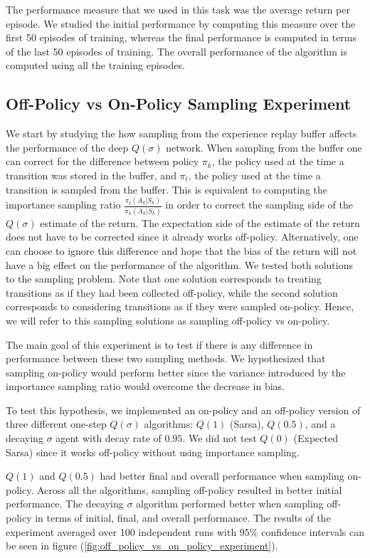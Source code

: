 The performance measure that we used in this task was the average return per episode.
We studied the initial performance by computing this measure over the first 50 episodes of training, whereas the final performance is computed in terms of the last 50 episodes of training.
The overall performance of the algorithm is computed using all the training episodes.

\subsection{Off-Policy vs On-Policy Sampling Experiment}

We start by studying the how sampling from the experience replay buffer affects the performance of the deep $Q(\sigma)$ network.
When sampling from the buffer one can correct for the difference between policy $\pi_k$, the policy used at the time a transition was stored in the buffer, and $\pi_t$, the policy used at the time a transition is sampled from the buffer.
This is equivalent to computing the importance sampling ratio $\frac{\pi_t(A_k|S_k)}{\pi_k(A_k|S_k)}$ in order to correct the sampling side of the $Q(\sigma)$ estimate of the return.
The expectation side of the estimate of the return does not have to be corrected since it already works off-policy.
Alternatively, one can choose to ignore this difference and hope that the bias of the return will not have a big effect on the performance of the algorithm.
We tested both solutions to the sampling problem.
Note that one solution corresponds to treating transitions as if they had been collected off-policy, while the second solution corresponds to considering transitions as if they were sampled on-policy.
Hence, we will refer to this sampling solutions as sampling off-policy vs on-policy.

The main goal of this experiment is to test if there is any difference in performance between these two sampling methods.
We hypothesized that sampling on-policy would perform better since the variance introduced by the importance sampling ratio would overcome the decrease in bias.

To test this hypothesis, we implemented an on-policy and an off-policy version of three different one-step $Q(\sigma)$ algorithms: $Q(1)$ (Sarsa), $Q(0.5)$, and a decaying $\sigma$ agent with decay rate of $0.95$.
We did not test $Q(0)$ (Expected Sarsa) since it works off-policy without using importance sampling.

$Q(1)$ and $Q(0.5)$ had better final and overall performance when sampling on-policy.
Across all the algorithms, sampling off-policy resulted in better initial performance.
The decaying $\sigma$ algorithm performed better when sampling off-policy in terms of initial, final, and overall performance.
The results of the experiment averaged over 100 independent runs with $95\%$ confidence intervals can be seen in figure (\ref{fig:off_policy_vs_on_policy_experiment}).

